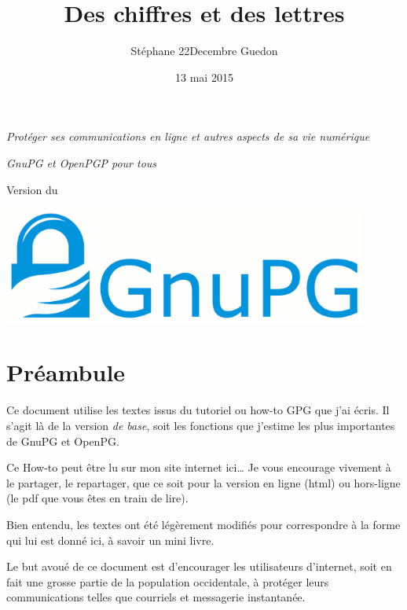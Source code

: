 \documentclass[10pt,a4paper]{book}
\title{Des chiffres et des lettres}
\author{Stéphane 22Decembre Guedon}
\date{13 mai 2015}
\begin{document}
\thispagestyle{empty}
\makeatletter
\begin{center}
	{\Huge\textbf\@title}
	
	\vspace{0.3cm}
	
	{\Large\emph{Protéger ses communications en ligne et autres aspects de sa vie numérique}}
	
	\vspace{0.3cm}
	
	{\LARGE\emph{GnuPG et OpenPGP pour tous}}
	
	\vspace{1.6cm}
	{\large Version du \@date}
	\vspace{1.6cm}
	
	\includegraphics[width=0.9\textwidth]{./images/logo-gnupg}\\
	\vspace{2.1cm}
\end{center}




	\frontmatter
	\chapter{Préambule}
	
		Ce document utilise les textes issus du tutoriel ou how-to GPG que j'ai écris. Il s'agit là de la version \textit{de base}, soit les fonctions que j'estime les plus importantes de GnuPG et OpenPG.
		
		Ce How-to peut être lu sur mon site internet ici… Je vous encourage vivement à le partager, le repartager, que ce soit pour la version en ligne (html) ou hors-ligne (le pdf que vous êtes en train de lire).
		
		Bien entendu, les textes ont été légèrement modifiés pour correspondre à la forme qui lui est donné ici, à savoir un mini livre.
		
		Le but avoué de ce document est d'encourager les utilisateurs d'internet, soit en fait une grosse partie de la population occidentale, à protéger leurs communications telles que courriels et messagerie instantanée.
		
\end{document}
